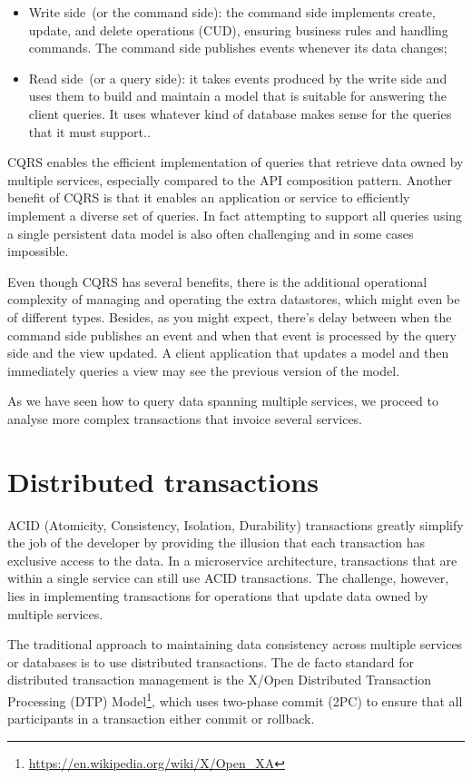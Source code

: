 \documentclass[conference]{IEEEtran}
\begin{document}
\begin{itemize}
  \item Write side (or the command side): the command side implements create, update, and delete operations (CUD), ensuring business rules and handling commands. The command side publishes events whenever its data changes;
  \item Read side (or a query side): it takes events produced by the write side and uses them to build and maintain a model that is suitable for answering the client queries. It uses whatever kind of database makes sense for the queries that it must support..
\end{itemize}

CQRS enables the efficient implementation of queries that retrieve data owned by multiple services, especially compared to the API composition pattern. Another benefit of CQRS is that it enables an application or service to efficiently implement a diverse set of queries. In fact attempting to support all queries using a single persistent data model is also often challenging and in some cases impossible.

Even though CQRS has several benefits, there is the additional operational complexity of managing and operating the extra datastores, which might even be of different types. Besides, as you might expect, there’s delay between when the command side publishes an event and when that event is processed by the query side and the view updated. A client application that updates a model and then immediately queries a view may see the previous version of the model.

As we have seen how to query data spanning multiple services, we proceed to analyse more complex transactions that invoice several services.

\section{Distributed transactions}

ACID (Atomicity, Consistency, Isolation, Durability) transactions greatly simplify the job of the developer by providing the illusion that each transaction has exclusive access to the data. In a microservice architecture, transactions that are within a single service can still use ACID transactions. The challenge, however, lies in implementing transactions for operations that update data owned by multiple services.

The traditional approach to maintaining data consistency across multiple services or databases is to use distributed transactions. The de facto standard for distributed transaction management is the X/Open Distributed Transaction Processing (DTP) Model\footnote{\url{https://en.wikipedia.org/wiki/X/Open_XA}}, which uses two-phase commit (2PC) to ensure that all participants in a transaction either commit or rollback. 
\end{document}
